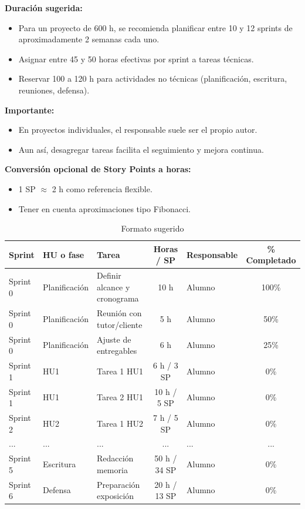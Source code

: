 \documentclass[
11pt, %
]{charter}
\begin{document}
\textbf{Duración sugerida:}
\begin{itemize}
  \item Para un proyecto de 600 h, se recomienda planificar entre 10 y 12 sprints de aproximadamente 2 semanas cada uno.
  \item Asignar entre 45 y 50 horas efectivas por sprint a tareas técnicas.
  \item Reservar 100 a 120 h para actividades no técnicas (planificación, escritura, reuniones, defensa).
\end{itemize}

\textbf{Importante:}
\begin{itemize}
  \item En proyectos individuales, el responsable suele ser el propio autor.
  \item Aun así, desagregar tareas facilita el seguimiento y mejora continua.
\end{itemize}

\textbf{Conversión opcional de Story Points a horas:}
\begin{itemize}
  \item 1 SP \(\approx\) 2 h como referencia flexible.
  \item Tener en cuenta aproximaciones tipo Fibonacci.
\end{itemize}

\begin{table}[htpb]
\centering
\caption{Formato sugerido}
\begin{tabularx}{\linewidth}{@{}|l|l|X|c|l|c|@{}}
\hline
\rowcolor[HTML]{C0C0C0}
Sprint & HU o fase & Tarea & Horas / SP & Responsable & \% Completado \\ \hline
Sprint 0 & Planificación & Definir alcance y cronograma & 10 h & Alumno & 100\% \\ \hline
Sprint 0 & Planificación & Reunión con tutor/cliente & 5 h & Alumno & 50\% \\ \hline
Sprint 0 & Planificación & Ajuste de entregables & 6 h & Alumno & 25\% \\ \hline
Sprint 1 & HU1 & Tarea 1 HU1 & 6 h / 3 SP & Alumno & 0\% \\ \hline
Sprint 1 & HU1 & Tarea 2 HU1 & 10 h / 5 SP & Alumno & 0\% \\ \hline
Sprint 2 & HU2 & Tarea 1 HU2 & 7 h / 5 SP & Alumno & 0\% \\ \hline
... & ... & ... & ... & ... & ... \\ \hline
Sprint 5 & Escritura & Redacción memoria & 50 h / 34 SP & Alumno & 0\% \\ \hline
Sprint 6 & Defensa & Preparación exposición & 20 h / 13 SP & Alumno & 0\% \\ \hline
\end{tabularx}
\end{table}
\end{document}
